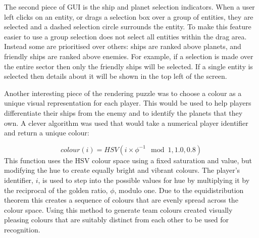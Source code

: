 The second piece of GUI is the ship and planet selection indicators. When a user left clicks on an entity, or drags a selection box over a group of entities, they are selected and a dashed selection circle surrounds the entity. To make this feature easier to use a group selection does not select all entities within the drag area. Instead some are prioritised over others: ships are ranked above planets, and friendly ships are ranked above enemies. For example, if a selection is made over the entire sector then only the friendly ships will be selected. If a single entity is selected then details about it will be shown in the top left of the screen.


Another interesting piece of the rendering puzzle was to choose a colour as a unique visual representation for each player. This would be used to help players differentiate their ships from the enemy and to identify the planets that they own. A clever algorithm was used that would take a numerical player identifier and return a unique colour:\cite{ankerl2009}

\begin{equation*}
	colour(i) = HSV(i \times \phi^{-1} \mod 1, 1.0, 0.8)
\end{equation*}
\noindent
This function uses the HSV colour space using a fixed saturation and value, but modifying the hue to create equally bright and vibrant colours. The player's identifier, $i$, is used to step into the possible values for hue by multiplying it by the reciprocal of the golden ratio, $\phi$, modulo one. Due to the equidistribution theorem this creates a sequence of colours that are evenly spread across the colour space. Using this method to generate team colours created visually pleasing colours that are suitably distinct from each other to be used for recognition.
